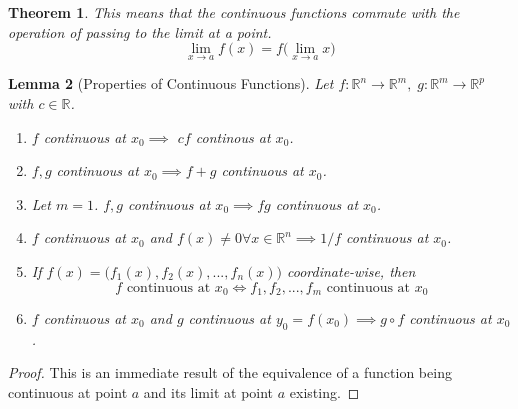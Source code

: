 \documentclass{article}
\newtheorem{theorem}{Theorem}[section]
\newtheorem{lemma}[theorem]{Lemma}
\theoremstyle{remark}
\theoremstyle{definition}
\begin{document}
\begin{theorem}
This means that the continuous functions commute with the operation of passing to the limit at a point. 
\[\lim_{x \rightarrow a} f(x) = f\Big( \lim_{x \rightarrow a} x \Big)\]
\end{theorem}

\begin{lemma}[Properties of Continuous Functions]
Let $f: \mathbb{R}^n \longrightarrow \mathbb{R}^m, \; g: \mathbb{R}^m \longrightarrow \mathbb{R}^p$ with $c \in \mathbb{R}$. 
\begin{enumerate}
    \item $f$ continuous at $x_0 \implies$ $c f$ continous at $x_0$. 
    \item $f, g$ continuous at $x_0 \implies f + g$ continuous at $x_0$. 
    \item Let $m = 1$. $f, g$ continuous at $x_0 \implies f g$ continuous at $x_0$. 
    \item $f$ continuous at $x_0$ and $f(x) \neq 0 \forall x \in \mathbb{R}^n \implies 1 / f$ continuous at $x_0$. 
    \item If $f(x) = \big( f_1(x), f_2(x), ..., f_n(x) \big)$ coordinate-wise, then 
\[ f \text{ continuous at } x_0 \iff f_1, f_2, ..., f_m \text{ continuous  at } x_0\]
    \item $f$ continuous at $x_0$ and $g$ continuous at $y_0 = f(x_0) \implies g \circ f$ continuous at $x_0$. 
\end{enumerate}
\end{lemma}
\begin{proof}
This is an immediate result of the equivalence of a function being continuous at point $a$ and its limit at point $a$ existing. 
\end{proof}
\end{document}
